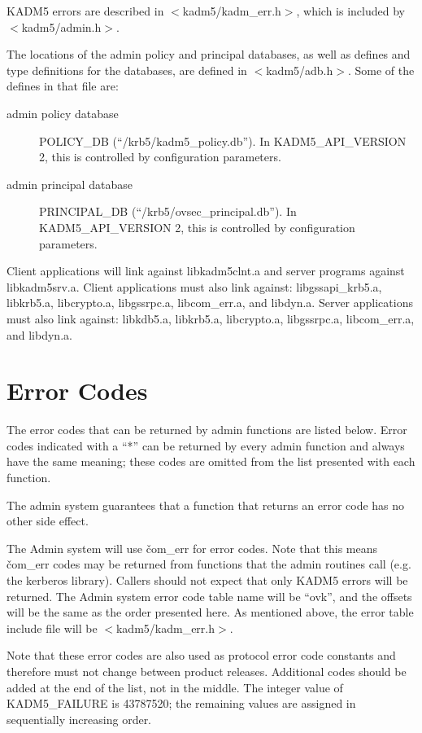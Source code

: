 KADM5 errors are described in $<$kadm5/kadm_err.h$>$, which
is included by $<$kadm5/admin.h$>$.

The locations of the admin policy and principal databases, as well as
defines and type definitions for the databases, are defined in
$<$kadm5/adb.h$>$.  Some of the defines in that file are:
\begin{description}
\item[admin policy database] POLICY_DB (``/krb5/kadm5_policy.db'').    In
KADM5_API_VERSION 2, this is controlled by configuration parameters.
\item[admin principal database] PRINCIPAL_DB
(``/krb5/ovsec_principal.db'').  In KADM5_API_VERSION 2, this is
controlled by configuration parameters.
\end{description}

Client applications will link against libkadm5clnt.a and server
programs against libkadm5srv.a.  Client applications must also link
against: libgssapi_krb5.a, libkrb5.a, libcrypto.a, libgssrpc.a,
libcom_err.a, and libdyn.a.  Server applications must also link
against: libkdb5.a, libkrb5.a, libcrypto.a, libgssrpc.a, libcom_err.a,
and libdyn.a.

\section{Error Codes}

The error codes that can be returned by admin functions are listed
below.  Error codes indicated with a ``*'' can be returned by every
admin function and always have the same meaning; these codes are
omitted from the list presented with each function.

The admin system guarantees that a function that returns an error code
has no other side effect.

The Admin system will use \v{com_err} for error codes.  Note that this
means \v{com_err} codes may be returned from functions that the admin
routines call (e.g. the kerberos library). Callers should not expect
that only KADM5 errors will be returned.  The Admin system error code
table name will be ``ovk'', and the offsets will be the same as the
order presented here. As mentioned above, the error table include file
will be $<$kadm5/kadm_err.h$>$.

Note that these error codes are also used as protocol error code
constants and therefore must not change between product releases.
Additional codes should be added at the end of the list, not in the
middle.  The integer value of KADM5_FAILURE is 43787520; the
remaining values are assigned in sequentially increasing order.

